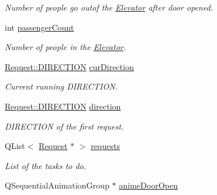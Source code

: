 \begin{DoxyCompactItemize}
\begin{DoxyCompactList}\small\item\em Number of people go outof the \hyperlink{class_elevator}{Elevator} after door opened. \end{DoxyCompactList}\item 
\hypertarget{class_elevator_ad650e2c1962ac39ee93b33b52d30c824}{
int \hyperlink{class_elevator_ad650e2c1962ac39ee93b33b52d30c824}{passengerCount}}
\label{class_elevator_ad650e2c1962ac39ee93b33b52d30c824}

\begin{DoxyCompactList}\small\item\em Number of people in the \hyperlink{class_elevator}{Elevator}. \end{DoxyCompactList}\item 
\hypertarget{class_elevator_a700abab6b67b912087607a94fa194110}{
\hyperlink{class_request_a31872cb7919df688dc6866ea607b9d9d}{Request::DIRECTION} \hyperlink{class_elevator_a700abab6b67b912087607a94fa194110}{curDirection}}
\label{class_elevator_a700abab6b67b912087607a94fa194110}

\begin{DoxyCompactList}\small\item\em Current running DIRECTION. \end{DoxyCompactList}\item 
\hypertarget{class_elevator_a0e5685fa3ebcfb3c5e4810adc6c5388a}{
\hyperlink{class_request_a31872cb7919df688dc6866ea607b9d9d}{Request::DIRECTION} \hyperlink{class_elevator_a0e5685fa3ebcfb3c5e4810adc6c5388a}{direction}}
\label{class_elevator_a0e5685fa3ebcfb3c5e4810adc6c5388a}

\begin{DoxyCompactList}\small\item\em DIRECTION of the first request. \end{DoxyCompactList}\item 
\hypertarget{class_elevator_ab64bb0f856260d8bac401c96618ccb36}{
QList$<$ \hyperlink{class_request}{Request} $\ast$ $>$ \hyperlink{class_elevator_ab64bb0f856260d8bac401c96618ccb36}{requests}}
\label{class_elevator_ab64bb0f856260d8bac401c96618ccb36}

\begin{DoxyCompactList}\small\item\em List of the tasks to do. \end{DoxyCompactList}\item 
\hypertarget{class_elevator_a5d2c79ac63afc0891c97ad4e65cac2a9}{
QSequentialAnimationGroup $\ast$ \hyperlink{class_elevator_a5d2c79ac63afc0891c97ad4e65cac2a9}{animeDoorOpen}}
\label{class_elevator_a5d2c79ac63afc0891c97ad4e65cac2a9}


\end{DoxyCompactItemize}
